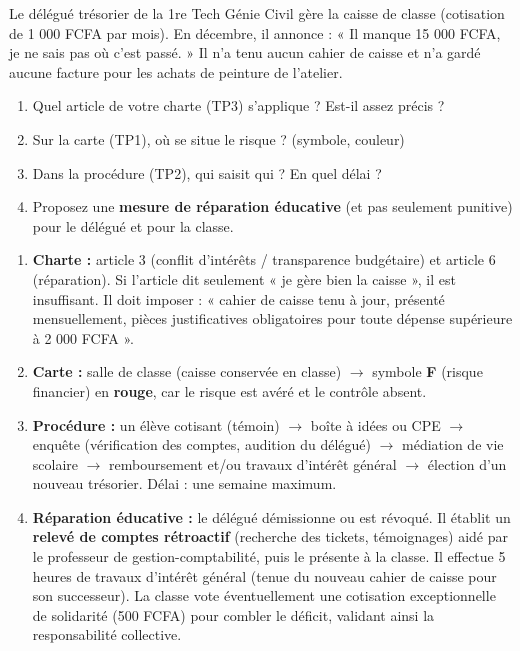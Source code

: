 \documentclass[11pt]{article}
\begin{document}
\begin{exercice}
Le délégué trésorier de la 1re Tech Génie Civil gère la caisse de classe (cotisation de 1 000 FCFA par mois). En décembre, il annonce : « Il manque 15 000 FCFA, je ne sais pas où c'est passé. » Il n'a tenu aucun cahier de caisse et n'a gardé aucune facture pour les achats de peinture de l'atelier.
\begin{enumerate}
    \item Quel article de votre charte (TP3) s'applique ? Est-il assez précis ?
    \item Sur la carte (TP1), où se situe le risque ? (symbole, couleur)
    \item Dans la procédure (TP2), qui saisit qui ? En quel délai ?
    \item Proposez une \textbf{mesure de réparation éducative} (et pas seulement punitive) pour le délégué et pour la classe.
\end{enumerate}
\end{exercice}

\begin{corrige}
\begin{enumerate}
    \item \textbf{Charte :} article 3 (conflit d'intérêts / transparence budgétaire) et article 6 (réparation). Si l'article dit seulement « je gère bien la caisse », il est insuffisant. Il doit imposer : « cahier de caisse tenu à jour, présenté mensuellement, pièces justificatives obligatoires pour toute dépense supérieure à 2 000 FCFA ».
    \item \textbf{Carte :} salle de classe (caisse conservée en classe) $\to$ symbole \textbf{F} (risque financier) en \textbf{rouge}, car le risque est avéré et le contrôle absent.
    \item \textbf{Procédure :} un élève cotisant (témoin) $\to$ boîte à idées ou CPE $\to$ enquête (vérification des comptes, audition du délégué) $\to$ médiation de vie scolaire $\to$ remboursement et/ou travaux d'intérêt général $\to$ élection d'un nouveau trésorier. Délai : une semaine maximum.
    \item \textbf{Réparation éducative :} le délégué démissionne ou est révoqué. Il établit un \textbf{relevé de comptes rétroactif} (recherche des tickets, témoignages) aidé par le professeur de gestion-comptabilité, puis le présente à la classe. Il effectue 5 heures de travaux d'intérêt général (tenue du nouveau cahier de caisse pour son successeur). La classe vote éventuellement une cotisation exceptionnelle de solidarité (500 FCFA) pour combler le déficit, validant ainsi la responsabilité collective.
\end{enumerate}
\end{corrige}
\end{document}
